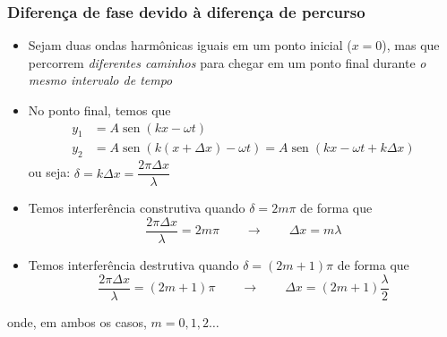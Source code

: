 \documentclass[t,%
brazilian,%
11pt,%
aspectratio=169,%
table%
]{beamer}
\DeclareMathOperator{\sen}{sen}
\begin{document}
\begin{frame}
    \frametitle{Diferença de fase devido à diferença de percurso}
    \begin{itemize}
        \item Sejam duas ondas harmônicas iguais em um ponto inicial
            (\(x=0\)), mas que percorrem \textit{diferentes caminhos} para chegar em um
            ponto final durante \textit{o mesmo intervalo de tempo}
            \begin{center}
            \end{center}
        \item No ponto final, temos que
            \begin{align*}
                y_1 &= A \sen{(kx -\omega t)} \\
                y_2 &= A \sen{(k(x+\Delta x) -\omega t)} = A \sen{(kx -\omega t +k\Delta x)}
            \end{align*}
            ou seja: \(\delta = k\Delta x = \dfrac{2\pi\Delta x}{\lambda}\)
    \end{itemize}
\end{frame}

\begin{frame}
    \begin{itemize}
        \item Temos interferência construtiva quando \(\delta=2m\pi\) de forma que
            \[
                \frac{2\pi\Delta x}{\lambda} = 2m\pi \qquad \rightarrow \qquad \Delta x = m\lambda
            \]
        \item Temos interferência destrutiva quando \(\delta=(2m+1)\pi\) de forma que
            \[
                \frac{2\pi\Delta x}{\lambda} = (2m+1)\pi \qquad \rightarrow \qquad \Delta x = (2m+1)\frac{\lambda}{2}
            \]
    \end{itemize}
    onde, em ambos os casos, \(m=0,1,2\ldots\)
\end{frame}
\end{document}

